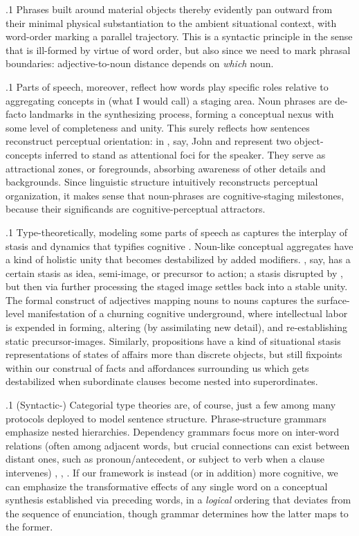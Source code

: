 \documentclass[11pt, twocolumn]{article}
\begin{document}
\p.1{%
\:\+Phrases built around material objects thereby evidently
pan outward from their minimal physical substantiation
to the ambient situational context, with word-order
marking a parallel trajectory. \>  This is a syntactic
principle in the sense that  is ill-formed
by virtue of word order, but also since we
need to mark phrasal boundaries: adjective-to-noun distance
depends on \textit{which} noun.\<\;
}%

\p.1{%
\:\+Parts of speech, moreover, reflect how words play
specific roles relative to aggregating concepts in
(what I would call) a  staging area. \> 
Noun phrases are de-facto landmarks in the synthesizing
process, forming a conceptual nexus with some
level of completeness and unity. \>  This surely reflects
how sentences reconstruct perceptual orientation:
in \jrefs{}, say, John and  represent two
object-concepts inferred to stand as
attentional foci for the speaker. \>  They serve
as attractional zones, or foregrounds, absorbing
awareness of other details and backgrounds. \>  Since linguistic structure
intuitively reconstructs perceptual organization,
it makes sense that noun-phrases are cognitive-staging
milestones, because their significands are cognitive-perceptual
attractors.\<\;
}%

\p.1{%
\:\+Type-theoretically, modeling some parts of speech as
 captures the
interplay of stasis and dynamics that typifies
cognitive . \>  Noun-like conceptual
aggregates have a kind of holistic unity that becomes
destabilized by added modifiers. \>  , say,
has a certain stasis as idea, semi-image, or
precursor to action; a stasis disrupted by , but
then via further processing the staged image settles
back into a stable unity. \>  The formal construct
of adjectives mapping nouns to nouns captures the
surface-level manifestation of a churning cognitive
underground, \pgl{}where intellectual labor is expended in
forming, altering (by assimilating new detail), and
re-establishing static precursor-images. \>  Similarly, propositions
have a kind of situational stasis \mdash{} representations of
states of affairs more than
discrete objects, but still fixpoints within
our construal of facts and affordances surrounding us \mdash{}
which gets destabilized when subordinate clauses become nested into
superordinates.\<\;
}%

\p.1{%
\:\+(Syntactic-) Categorial type theories are, of course, just a few among many protocols
deployed to model sentence structure. \>  Phrase-structure grammars emphasize
nested hierarchies. \>  Dependency grammars
focus more on inter-word relations (often among adjacent words, but crucial
connections can exist between distant ones, such as pronoun/antecedent,
or subject to verb when a clause intervenes)
, , . \> 
If our framework is instead (or in addition) more
cognitive, we can emphasize the transformative effects
of any single word on a conceptual synthesis established
via preceding words, in a \textit{logical} ordering that
deviates from the sequence of enunciation, though grammar
determines how the latter maps to the former.\<\;
}%
\end{document}
